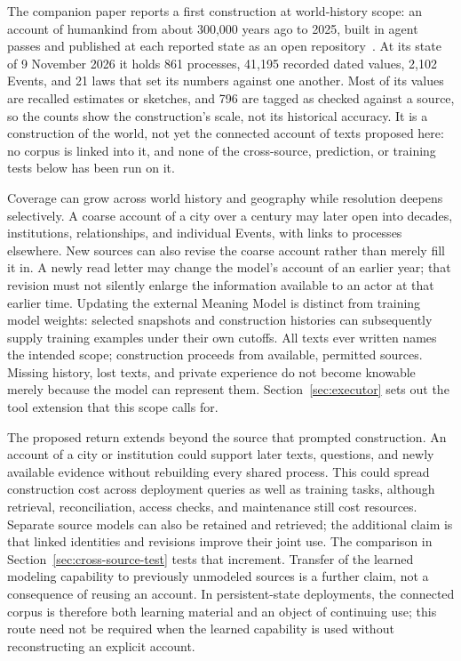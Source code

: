 \documentclass[10pt]{article}
\begin{document}
The companion paper reports a first construction at world-history scope: an
account of humankind from about 300,000 years ago to 2025, built in agent
passes and published at each reported state as an open
repository~\cite{westerbergMeaning2026}. At its state of 9 November 2026 it holds
861 processes, 41,195 recorded dated values, 2,102 Events, and 21 laws that set its
numbers against one another. Most of its values are recalled
estimates or sketches, and 796 are tagged as checked against a source, so the
counts show the construction's scale, not its historical accuracy. It is a
construction of the world, not yet the connected account of texts proposed here: no corpus is linked into it,
and none of the cross-source, prediction, or training tests below has been run
on it.

Coverage can grow across world history and geography while resolution deepens
selectively. A coarse account of a city over a century may later open into
decades, institutions, relationships, and individual Events, with links to
processes elsewhere. New sources can also revise the coarse account rather
than merely fill it in. A newly read letter may change the model's account of
an earlier year; that revision must not silently enlarge the information
available to an actor at that earlier time. Updating the external Meaning Model is distinct from
training model weights: selected snapshots and construction histories can
subsequently supply training examples under their own cutoffs. All texts ever
written names the intended scope; construction proceeds from available,
permitted sources. Missing history, lost texts, and private experience do not
become knowable merely because the model can represent them. Section~\ref{sec:executor} sets out the tool
extension that this scope calls for.

The proposed return extends beyond the source that prompted construction. An
account of a city or institution could support later texts, questions, and
newly available evidence without rebuilding every shared process. This could
spread construction cost across deployment queries as well as training tasks,
although retrieval, reconciliation, access checks, and maintenance still cost
resources. Separate source models can also be retained and retrieved; the
additional claim is that linked identities and revisions improve their joint
use. The comparison in Section~\ref{sec:cross-source-test} tests that increment.
Transfer of the learned modeling capability to previously unmodeled sources is
a further claim, not a consequence of reusing an account. In persistent-state
deployments, the connected corpus is therefore both learning material and an
object of continuing use; this route need not be required when the learned
capability is used without reconstructing an explicit account.
\end{document}
